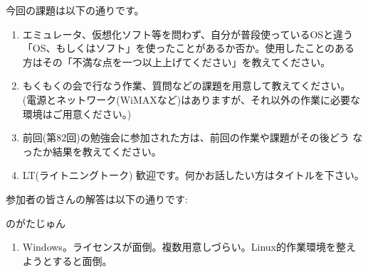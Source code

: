 \documentclass[mingoth,a4paper]{jsarticle}
\begin{document}
今回の課題は以下の通りです。
\begin{screen}
  \begin{enumerate}
  \item %
    エミュレータ、仮想化ソフト等を問わず、自分が普段使っているOSと違う
    「OS、もしくはソフト」を使ったことがあるか否か。使用したことのある
    方はその「不満な点を一つ以上上げてください」を教えてください。

  \item %
    もくもくの会で行なう作業、質問などの課題を用意して教えてください。
    (電源とネットワーク(WiMAXなど)はありますが、それ以外の作業に必要な
    環境はご用意ください。)

  \item %
    前回(第82回)の勉強会に参加された方は、前回の作業や課題がその後どう
    なったか結果を教えてください。

  \item %
    LT(ライトニングトーク) 歓迎です。何かお話したい方はタイトルを下さい。
  \end{enumerate}
\end{screen}

参加者の皆さんの解答は以下の通りです:

\begin{prework} { のがたじゅん }
 \begin{enumerate}
  \item Windows。ライセンスが面倒。複数用意しづらい。Linux的作業環境を整えようとすると面倒。
 \end{enumerate}
\end{prework}
\end{document}
